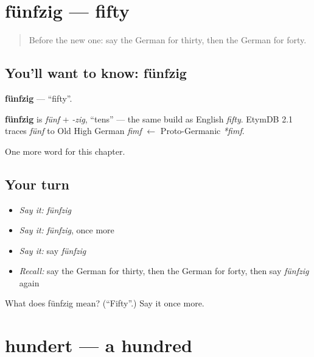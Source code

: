 \section[fünfzig]{fünfzig — fifty}

\label{lesson:GE-C101-fuenfzig}



\begin{quote}
Before the new one: say the German for thirty, then the German for forty.
\end{quote}

\subsection*{You'll want to know: fünfzig}
\textbf{fünfzig} — \textquotedblleft{}fifty\textquotedblright{}.

\begin{cousinweb}
\textbf{fünfzig} is \emph{fünf} + \emph{-zig}, \textquotedblleft{}tens\textquotedblright{} — the same build as English \emph{fifty}. EtymDB 2.1 traces \emph{fünf} to Old High German \emph{fimf} $\leftarrow$ Proto-Germanic \emph{*fimf}.
\end{cousinweb}

\begin{grammarlens}[title={What you've built}]
One more word for this chapter.
\end{grammarlens}

\subsection*{Your turn}
\begin{itemize}
\raggedright
  \item \emph{Say it:} \emph{fünfzig}
  \item \emph{Say it:} \emph{fünfzig}, once more
  \item \emph{Say it:} say \emph{fünfzig}
  \item \emph{Recall:} say the German for thirty, then the German for forty, then say \emph{fünfzig} again
\end{itemize}

\begin{tcolorbox}[breakable,colback=teal!4,colframe=teal!35!black,title={Before you move on}]
What does fünfzig mean? (\textquotedblleft{}Fifty\textquotedblright{}.) Say it once more.
\end{tcolorbox}
\section[hundert]{hundert — a hundred}

